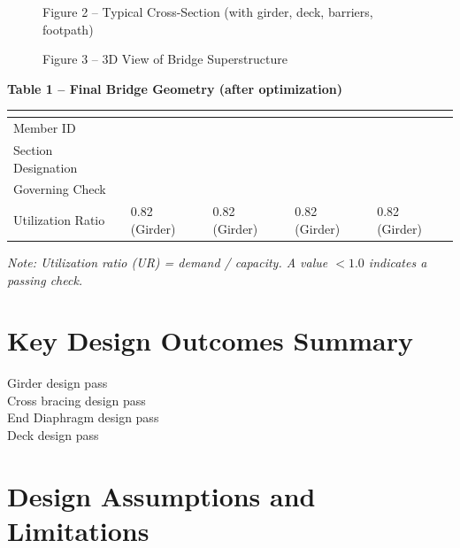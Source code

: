 \documentclass[12pt,a4paper]{report}
\numberwithin{table}{chapter}
\numberwithin{figure}{chapter}
\begin{document}
\begin{figure}[H]
\centering
{}
\caption*{Figure 2 -- Typical Cross-Section (with girder, deck, barriers, footpath)}
\end{figure}

\begin{figure}[H]
\centering
{}
\caption*{Figure 3 -- 3D View of Bridge Superstructure}
\end{figure}

\noindent\textbf{Table 1 -- Final Bridge Geometry (after optimization)}

\vspace{0.4em}
\noindent
\begin{tabular}{|C{2.8cm}|C{3.0cm}|C{3.0cm}|C{3.0cm}|C{3.0cm}|}
\hline
  \textbf{} &
  \textbf{} &
  \textbf{} &
  \textbf{} &
  \textbf{} \\
\hline
Member ID &  &  &  &  \\
\hline
Section Designation &  &  &  &  \\
\hline
Governing Check &  &  &  &  \\
\hline
Utilization Ratio & 0.82 (Girder) & 0.82 (Girder) & 0.82 (Girder) & 0.82 (Girder) \\
\hline
\end{tabular}

\vspace{0.4em}
\noindent\textit{Note: Utilization ratio (UR) = demand / capacity. A value $< 1.0$ indicates a passing check.}

\vspace{1em}

\section*{Key Design Outcomes Summary}
\label{sec:key-outcomes}

\noindent Girder design pass \\
Cross bracing design pass \\
End Diaphragm design pass \\
Deck design pass

\section*{Design Assumptions and Limitations}
\label{sec:assumptions}
\end{document}
